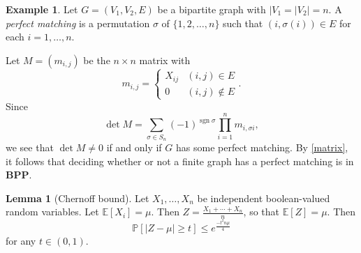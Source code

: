 \documentclass[10pt,letterpaper,cm]{nupset}
\theoremstyle{definition}
\newtheorem{exmp}[definition]{Example}
\theoremstyle{theorem}
\newtheorem{lemma}[definition]{Lemma}
\theoremstyle{remark}
\newcommand{\1}{\mathbf{1}}
\newcommand{\0}{\vec 0}
\DeclareMathOperator{\sgn}{sgn}
\begin{document}
\begin{exmp}
Let $G=\left(V_1, V_2, E\right)$ be a bipartite graph with $|V_1=|V_2|=n$. 
A \textit{perfect matching} is a permutation $\sigma$ of $\{1,2, \ldots, n\}$ such that $(i, \sigma(i)) \in E$ for each $i=1, \ldots, n$.

Let $M= (m_{i,j})$ be the $n\times n$ matrix with $$m_{i,j} = \begin{cases} X_{ij} & (i,j) \in E\\ 0 & (i,j) \notin E    \end{cases}.$$ Since $$\det{M} =  \sum_{\sigma \in S_n} ({-}1)^{\sgn{\sigma}} \prod_{i=1}^n m_{i, \sigma{i}} ,$$ we see that $\det{M} \ne 0$ if and only if $G$ has some perfect matching. By \cref{matrix}, it follows that deciding whether or not a finite graph has a perfect matching is in $\mathbf{BPP}$.
\end{exmp}

\begin{lemma}[Chernoff bound]
Let $X_1, \ldots, X_n$ be independent boolean-valued random variables. Let $\mathbb{E}[X_i]= \mu$. Then $Z= \frac{X_1 + \cdots + X_n}{n}$, so that $\mathbb{E}[Z] = \mu$. Then $$\mathbb{P}[\lvert{Z - \mu}\rvert \geq t] \leq e^{\frac{{-t^2n} \mu}{4}}$$ for any $t\in (0,1)$.
\end{lemma}
\end{document}
